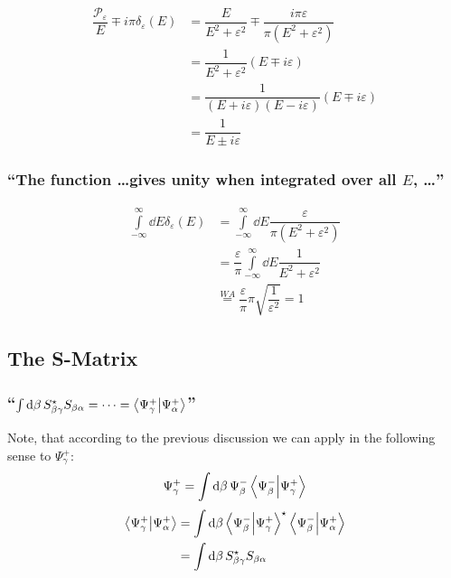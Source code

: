 \todo

\subsubsection{ }
\begin{align*}
	\dfrac{\mathcal{P}_\varepsilon}{E}\mp i \pi \delta_\varepsilon(E)&=
	\dfrac{E}{E^2+\varepsilon^2} \mp \dfrac{i \pi \varepsilon}{\pi (E^2+\varepsilon^2)}\\
	&=\dfrac{1}{E^2+\varepsilon^2}(E\mp i \varepsilon)\\
	&=\dfrac{1}{(E+i\varepsilon)(E-i\varepsilon)}(E\mp i \varepsilon)\\
	&=\dfrac{1}{E\pm i \varepsilon}
\end{align*}

\subsubsection{\enquote{The function \dots gives unity when integrated over all $E$, \dots} }

\begin{align*}
	\int\limits_{-\infty}^{\infty} \dd{E} \delta_\varepsilon (E)&=
	\int\limits_{-\infty}^{\infty} \dd{E} \dfrac{\varepsilon}{\pi(E^2+\varepsilon^2)}\\
	&=\dfrac{\varepsilon}{\pi}\int\limits_{-\infty}^{\infty} \dd{E}\dfrac{1}{E^2+\varepsilon^2}\\
	&\overset{WA}{=}\dfrac{\varepsilon}{\pi} \pi \sqrt{\dfrac{1}{\varepsilon^2}}=1
\end{align*}

\subsection{The S-Matrix}\label{susec:3_2}

\subsubsection{\enquote{$\int\dd{\beta}S_{\beta\gamma}^\star S_{\beta\alpha}=\dots=\braket{\Psi_\gamma^+}{\Psi_\alpha^+}$} }

Note, that according to the previous discussion we can apply  in the following sense to $\Psi_\gamma^+$:
\[\Psi_\gamma^+=\int\dd{\beta}\Psi_\beta^-\braket{\Psi_\beta^-}{\Psi_\gamma^+}\]
\begin{align*}
	\braket{\Psi_\gamma^+}{\Psi_\alpha^+}&=
	\int\dd{\beta}\braket{\Psi_\beta^-}{\Psi_\gamma^+}^\star \braket{\Psi_\beta^-}{\Psi_\alpha^+}\\
	&=\int\dd{\beta} S_{\beta\gamma}^\star S_{\beta\alpha}
\end{align*}

